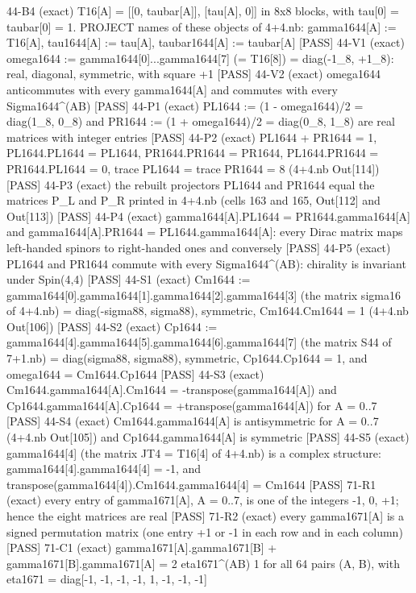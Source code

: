 \documentclass[
  10pt,
]{article}
\newenvironment{Shaded}{}{}
\newcommand{\NormalTok}[1]{#1}
\begin{document}
\begin{Shaded}
\begin{Highlighting}[]
\NormalTok{[PASS] 44{-}B4  (exact) T16[A] = [[0, taubar[A]], [tau[A], 0]] in 8x8 blocks, with tau[0] = taubar[0] = 1.  PROJECT names of these objects of 4+4.nb: gamma1644[A] := T16[A], tau1644[A] := tau[A], taubar1644[A] := taubar[A]}
\NormalTok{[PASS] 44{-}V1  (exact) omega1644 := gamma1644[0]...gamma1644[7] (= T16[8]) = diag({-}1\_8, +1\_8): real, diagonal, symmetric, with square +1}
\NormalTok{[PASS] 44{-}V2  (exact) omega1644 anticommutes with every gamma1644[A] and commutes with every Sigma1644\^{}(AB)}
\NormalTok{[PASS] 44{-}P1  (exact) PL1644 := (1 {-} omega1644)/2 = diag(1\_8, 0\_8) and PR1644 := (1 + omega1644)/2 = diag(0\_8, 1\_8) are real matrices with integer entries}
\NormalTok{[PASS] 44{-}P2  (exact) PL1644 + PR1644 = 1, PL1644.PL1644 = PL1644, PR1644.PR1644 = PR1644, PL1644.PR1644 = PR1644.PL1644 = 0, trace PL1644 = trace PR1644 = 8 (4+4.nb Out[114])}
\NormalTok{[PASS] 44{-}P3  (exact) the rebuilt projectors PL1644 and PR1644 equal the matrices P\_L and P\_R printed in 4+4.nb (cells 163 and 165, Out[112] and Out[113])}
\NormalTok{[PASS] 44{-}P4  (exact) gamma1644[A].PL1644 = PR1644.gamma1644[A] and gamma1644[A].PR1644 = PL1644.gamma1644[A]: every Dirac matrix maps left{-}handed spinors to right{-}handed ones and conversely}
\NormalTok{[PASS] 44{-}P5  (exact) PL1644 and PR1644 commute with every Sigma1644\^{}(AB): chirality is invariant under Spin(4,4)}
\NormalTok{[PASS] 44{-}S1  (exact) Cm1644 := gamma1644[0].gamma1644[1].gamma1644[2].gamma1644[3] (the matrix sigma16 of 4+4.nb) = diag({-}sigma88, sigma88), symmetric, Cm1644.Cm1644 = 1 (4+4.nb Out[106])}
\NormalTok{[PASS] 44{-}S2  (exact) Cp1644 := gamma1644[4].gamma1644[5].gamma1644[6].gamma1644[7] (the matrix S44 of 7+1.nb) = diag(sigma88, sigma88), symmetric, Cp1644.Cp1644 = 1, and omega1644 = Cm1644.Cp1644}
\NormalTok{[PASS] 44{-}S3  (exact) Cm1644.gamma1644[A].Cm1644 = {-}transpose(gamma1644[A]) and Cp1644.gamma1644[A].Cp1644 = +transpose(gamma1644[A]) for A = 0..7}
\NormalTok{[PASS] 44{-}S4  (exact) Cm1644.gamma1644[A] is antisymmetric for A = 0..7 (4+4.nb Out[105]) and Cp1644.gamma1644[A] is symmetric}
\NormalTok{[PASS] 44{-}S5  (exact) gamma1644[4] (the matrix JT4 = T16[4] of 4+4.nb) is a complex structure: gamma1644[4].gamma1644[4] = {-}1, and transpose(gamma1644[4]).Cm1644.gamma1644[4] = Cm1644}
\NormalTok{[PASS] 71{-}R1  (exact) every entry of gamma1671[A], A = 0..7, is one of the integers {-}1, 0, +1; hence the eight matrices are real}
\NormalTok{[PASS] 71{-}R2  (exact) every gamma1671[A] is a signed permutation matrix (one entry +1 or {-}1 in each row and in each column)}
\NormalTok{[PASS] 71{-}C1  (exact) gamma1671[A].gamma1671[B] + gamma1671[B].gamma1671[A] = 2 eta1671\^{}(AB) 1 for all 64 pairs (A, B), with eta1671 = diag[{-}1, {-}1, {-}1, {-}1, 1, {-}1, {-}1, {-}1]}

\end{Highlighting}
\end{Shaded}
\end{document}
